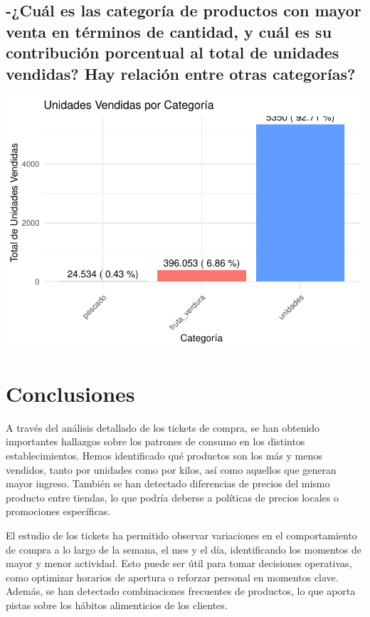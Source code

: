 \documentclass[,article,submit,moreauthors,pdftex]{Definitions/mdpi}
\begin{document}
\hypertarget{cuuxe1l-es-las-categoruxeda-de-productos-con-mayor-venta-en-tuxe9rminos-de-cantidad-y-cuuxe1l-es-su-contribuciuxf3n-porcentual-al-total-de-unidades-vendidas-hay-relaciuxf3n-entre-otras-categoruxedas}{%
\subsection{-¿Cuál es las categoría de productos con mayor venta en
términos de cantidad, y cuál es su contribución porcentual al total de
unidades vendidas? Hay relación entre otras
categorías?}\label{cuuxe1l-es-las-categoruxeda-de-productos-con-mayor-venta-en-tuxe9rminos-de-cantidad-y-cuuxe1l-es-su-contribuciuxf3n-porcentual-al-total-de-unidades-vendidas-hay-relaciuxf3n-entre-otras-categoruxedas}}

\includegraphics[width=0.9\linewidth]{ProyectoTD2025_files/figure-latex/unnamed-chunk-33-1}

\hypertarget{conclusiones}{%
\section{Conclusiones}\label{conclusiones}}

A través del análisis detallado de los tickets de compra, se han
obtenido importantes hallazgos sobre los patrones de consumo en los
distintos establecimientos. Hemos identificado qué productos son los más
y menos vendidos, tanto por unidades como por kilos, así como aquellos
que generan mayor ingreso. También se han detectado diferencias de
precios del mismo producto entre tiendas, lo que podría deberse a
políticas de precios locales o promociones específicas.

El estudio de los tickets ha permitido observar variaciones en el
comportamiento de compra a lo largo de la semana, el mes y el día,
identificando los momentos de mayor y menor actividad. Esto puede ser
útil para tomar decisiones operativas, como optimizar horarios de
apertura o reforzar personal en momentos clave. Además, se han detectado
combinaciones frecuentes de productos, lo que aporta pistas sobre los
hábitos alimenticios de los clientes.
\end{document}
